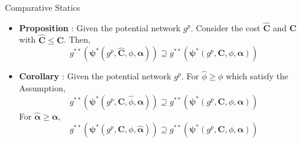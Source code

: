 \documentclass[10pt,dvipdfmx]{beamer}
\begin{document}
\begin{frame}{Comparative Statics}
\begin{itemize}
    \item {\bf{Proposition}} : Given the potential network $g^p$. Consider the cost $\bm{\hat{C}}$ and $\bm{C}$ with $\bm{\hat{C}} \le \bm{C}$. Then,
        \[ g^{**}(\bm{\psi}^*(g^p, \bm{\hat{C}}, \phi, \bm{\alpha})) \supseteq g^{**}(\bm{\psi}^*(g^p, \bm{C}, \phi, \bm{\alpha})) \]
    \item {\bf{Corollary}} : Given the potential network $g^p$. For $\hat{\phi} \ge \phi$ which satisfy the Assumption,
        \[ g^{**}(\bm{\psi}^*(g^p, \bm{C}, \hat{\phi}, \bm{\alpha})) \supseteq g^{**}(\bm{\psi}^*(g^p, \bm{C}, \phi, \bm{\alpha})) \]
        For $\bm{\hat{\alpha}} \ge \bm{\alpha}$,
        \[ g^{**}(\bm{\psi}^*(g^p, \bm{C}, \phi, \bm{\hat{\alpha}})) \supseteq g^{**}(\bm{\psi}^*(g^p, \bm{C}, \phi, \bm{\alpha})) \]
\end{itemize}
\end{frame}
\end{document}

